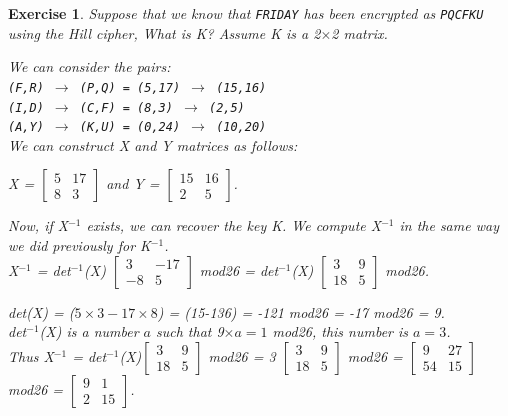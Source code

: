 \documentclass[a4paper, 12pt]{report}
\newtheorem{exercise}{\textbf{Exercise}}
\begin{document}
\begin{exercise}
	Suppose that we know that \texttt{FRIDAY} has been encrypted as \texttt{PQCFKU} using the Hill cipher, What is K? Assume K is a 2$\times$2 matrix.
	
	We can consider the pairs:\\
	\texttt{(F,R) $\rightarrow$ (P,Q) = (5,17) $\rightarrow$ (15,16)}\\
	\texttt{(I,D) $\rightarrow$ (C,F) = (8,3) $\rightarrow$ (2,5)}\\
	\texttt{(A,Y) $\rightarrow$ (K,U) = (0,24) $\rightarrow$ (10,20)}\\
	
	We can construct X and Y matrices as follows:
	\begin{center}
		X = $\begin{bmatrix}
		5 & 17\\
		8 & 3	
		\end{bmatrix}$ and Y = $
		\begin{bmatrix}
		15 & 16\\
		2 & 5	
		\end{bmatrix}$.
	\end{center}
	Now, if X$^{-1}$ exists, we can recover the key K. We compute X$^{-1}$ in the same way we did previously for K$^{-1}$.\\
	X$^{-1}$ = det$^{-1}$(X) $\begin{bmatrix}
	3 & -17\\
	-8 & 5	
	\end{bmatrix}$ mod26 = det$^{-1}$(X) $\begin{bmatrix}
	3 & 9\\
	18 & 5	
	\end{bmatrix}$ mod26.
	
	det(X) = ($5\times3-17\times8$) = (15-136) = -121 mod26 = -17 mod26 = 9.\\
	det$^{-1}$(X)  is a number $a$ such that 9$\times a = 1$ mod26, this number is $a=3$.\\
	
	Thus X$^{-1}$ = det$^{-1}$(X)$\begin{bmatrix}
	3 & 9\\
	18 & 5
	\end{bmatrix}$ mod26 = 3 $\begin{bmatrix}
	3 & 9\\
	18 & 5	
	\end{bmatrix}$ mod26 = $\begin{bmatrix}
	9 & 27\\
	54 & 15	
	\end{bmatrix}$ mod26 = $\begin{bmatrix}
	9 & 1\\
	2 & 15	
	\end{bmatrix}$.
	

\end{exercise}
\end{document}
